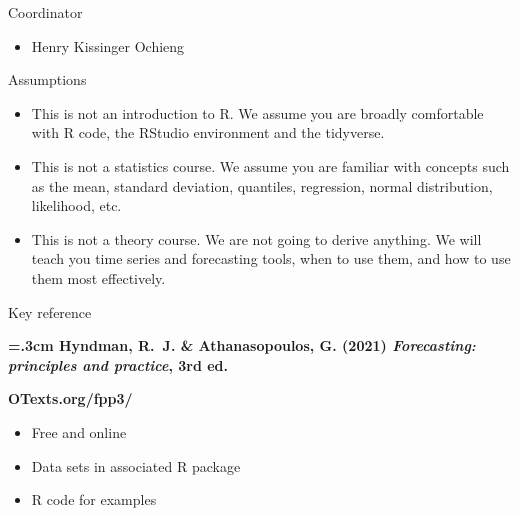 \documentclass[
  14pt,
  ignorenonframetext,
  aspectratio=169,
]{beamer}
\providecommand{\tightlist}{%
  \setlength{\itemsep}{0pt}\setlength{\parskip}{0pt}}
\begin{document}
\begin{frame}{Coordinator}
\protect{}\label{coordinator}
\begin{itemize}
\tightlist
\item
  Henry Kissinger Ochieng
\end{itemize}
\end{frame}

\begin{frame}{Assumptions}
\protect{}\label{assumptions}
\begin{itemize}
\tightlist
\item
  This is not an introduction to R. We assume you are broadly
  comfortable with R code, the RStudio environment and the tidyverse.
\item
  This is not a statistics course. We assume you are familiar with
  concepts such as the mean, standard deviation, quantiles, regression,
  normal distribution, likelihood, etc.
\item
  This is not a theory course. We are not going to derive anything. We
  will teach you time series and forecasting tools, when to use them,
  and how to use them most effectively.
\end{itemize}
\end{frame}

\begin{frame}{Key reference}
\protect{}\label{key-reference}
\large

\begin{block}{}\bf
{}\hangindent=.3cm
 {Hyndman, R.~J. \& Athanasopoulos, G. (2021) \emph{Forecasting: principles and practice}, 3rd ed.}
\end{block}\pause
\begin{alertblock}{}\Large
\centerline{\bf OTexts.org/fpp3/}
\end{alertblock}

\pause

\begin{itemize}
\tightlist
\item
  Free and online
\item
  Data sets in associated R package
\item
  R code for examples
\end{itemize}
\end{frame}
\end{document}
